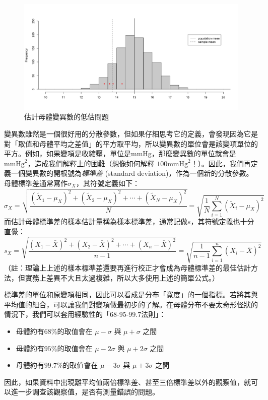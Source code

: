     \begin{figure}[htbp]
      \centering
      \includegraphics[width=\textwidth]{figures/02-Descriptive_statistics/degrees_of_freedom.png}
      \caption{估計母體變異數的低估問題}
      \label{fig:degrees_of_freedom}
    \end{figure}

    變異數雖然是一個很好用的分散參數，但如果仔細思考它的定義，會發現因為它是對「取值和母體平均之差值」的平方取平均，所以變異數的單位會是該變項單位的平方。例如，如果變項是收縮壓，單位是mmHg，那麼變異數的單位就會是$\text{mmHg}^2$，造成我們解釋上的困難（想像如何解釋 $100\text{mmHg}^2$！）。因此，我們再定義一個變異數的開根號為\textit{標準差} (standard deviation)，作為一個新的分散參數。母體標準差通常寫作$\sigma_X$，其符號定義如下：
    \[\sigma_X = \sqrt{\frac{(\tilde{X}_1-\mu_X)^2+(\tilde{X}_2-\mu_X)^2+\cdots+(\tilde{X}_N-\mu_X)^2}{N}} = \sqrt{\frac{1}{N} \sum_{i=1}^N (\tilde{X}_i-\mu_X)^2}\]
    而估計母體標準差的樣本估計量稱為樣本標準差，通常記做$s$，其符號定義也十分直覺：
    \[s_X = \sqrt{\frac{(X_1-\bar{X})^2+(X_2-\bar{X})^2+\cdots+(X_n-\bar{X})^2}{n-1}} = \sqrt{\frac{1}{n-1} \sum_{i=1}^n (X_i-\bar{X})^2}\]
    （註：理論上上述的樣本標準差還要再進行校正才會成為母體標準差的最佳估計方法，但實務上差異不大且太過複雜，所以大多使用上述的簡單公式。）

    標準差的單位和原變項相同，因此可以看成是分布「寬度」的一個指標。若將其與平均值的組合，可以讓我們對變項做最初步的了解。在母體分布不要太奇形怪狀的情況下，我們可以套用經驗性的「68-95-99.7法則」：
    \begin{itemize}
        \item 母體約有$68\%$的取值會在 $\mu-\sigma$ 與 $\mu+\sigma$ 之間
        \item 母體約有$95\%$的取值會在 $\mu-2\sigma$ 與 $\mu+2\sigma$ 之間
        \item 母體約有$99.7\%$的取值會在 $\mu-3\sigma$ 與 $\mu+3\sigma$ 之間
    \end{itemize}
    因此，如果資料中出現離平均值兩倍標準差、甚至三倍標準差以外的觀察值，就可以進一步調查該觀察值，是否有測量錯誤的問題。
    
